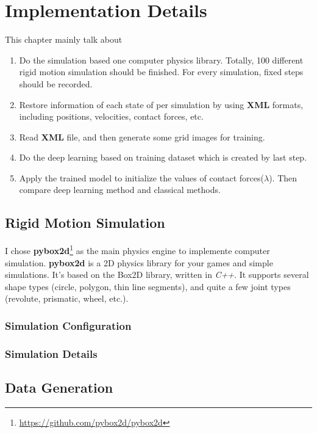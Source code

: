 \chapter{Implementation Details}

This chapter mainly talk about 
\begin{enumerate}
    \item Do the simulation based one computer physics library. Totally, 100 different rigid motion simulation should be finished. For every simulation, fixed steps should be recorded.
    \item Restore information of each state of per simulation by using \textbf{XML} formats, including positions, velocities, contact forces, etc.
    \item Read \textbf{XML} file, and then generate some grid images for training.
    \item Do the deep learning based on training dataset which is created by last step.
    \item Apply the trained model to initialize the values of contact forces($\lambda$). Then compare deep learning method and classical methods.
\end{enumerate}

\section{Rigid Motion Simulation}

I chose \textbf{pybox2d}\footnote{\url{https://github.com/pybox2d/pybox2d}} as the main physics engine to implemente computer simulation. \textbf{pybox2d} is a 2D physics library for your games and simple simulations. It's based on the Box2D library, written in \textit{C++}. It supports several shape types (circle, polygon, thin line segments), and quite a few joint types (revolute, prismatic, wheel, etc.).

\subsection{Simulation Configuration}

\subsection{Simulation Details}


\section{Data Generation}

